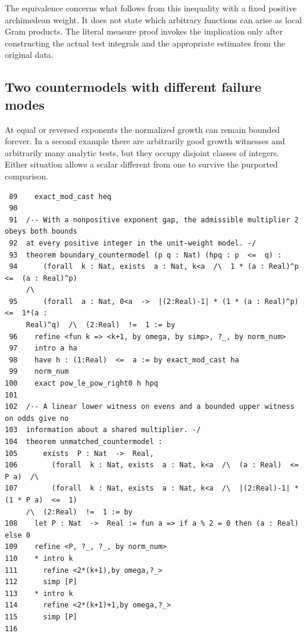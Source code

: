 \documentclass[12pt,letterpaper]{article}
\begin{document}
The equivalence concerns what follows from this inequality with a fixed positive archimedean weight. It does not state which arbitrary functions can arise as local Gram products. The literal measure proof invokes the implication only after constructing the actual test integrals and the appropriate estimates from the original data.
\clearpage{}\subsection*{Two countermodels with different failure modes}\label{extract-GrowthConsumer89}
At equal or reversed exponents the normalized growth can remain bounded forever. In a second example there are arbitrarily good growth witnesses and arbitrarily many analytic tests, but they occupy disjoint classes of integers. Either situation allows a scalar different from one to survive the purported comparison.
\par
{\fontsize{9.2}{11.2}\selectfont\begin{verbatim}
 89    exact_mod_cast heq
 90
 91  /-- With a nonpositive exponent gap, the admissible multiplier 2 obeys both bounds
 92  at every positive integer in the unit-weight model. -/
 93  theorem boundary_countermodel (p q : Nat) (hpq : p  <=  q) :
 94      (forall  k : Nat, exists  a : Nat, k<a  /\  1 * (a : Real)^p  <=  (a : Real)^p)
     /\
 95      (forall  a : Nat, 0<a  ->  |(2:Real)-1| * (1 * (a : Real)^p)  <=  1*(a :
     Real)^q)  /\  (2:Real)  !=  1 := by
 96    refine <fun k => <k+1, by omega, by simp>, ?_, by norm_num>
 97    intro a ha
 98    have h : (1:Real)  <=  a := by exact_mod_cast ha
 99    norm_num
100    exact pow_le_pow_right0 h hpq
101
102  /-- A linear lower witness on evens and a bounded upper witness on odds give no
103  information about a shared multiplier. -/
104  theorem unmatched_countermodel :
105      exists  P : Nat  ->  Real,
106        (forall  k : Nat, exists  a : Nat, k<a  /\  (a : Real)  <=  P a)  /\
107        (forall  k : Nat, exists  a : Nat, k<a  /\  |(2:Real)-1| * (1 * P a)  <=  1)
     /\  (2:Real)  !=  1 := by
108    let P : Nat  ->  Real := fun a => if a % 2 = 0 then (a : Real) else 0
109    refine <P, ?_, ?_, by norm_num>
110    * intro k
111      refine <2*(k+1),by omega,?_>
112      simp [P]
113    * intro k
114      refine <2*(k+1)+1,by omega,?_>
115      simp [P]
116
\end{verbatim}}
\end{document}

